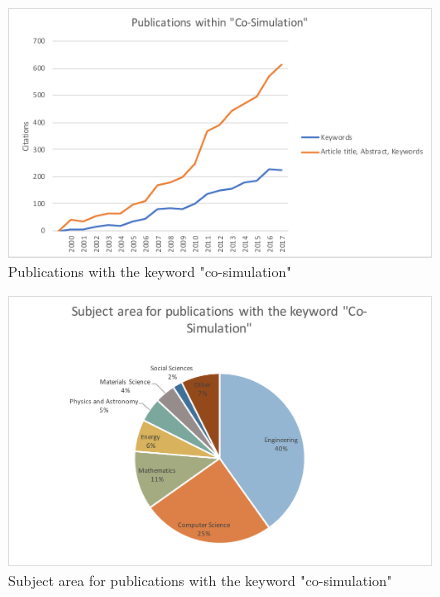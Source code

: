 \begin{figure}[h!]
\centering
\includegraphics[width=1\textwidth]{Figures/Publications.pdf}
\caption{Publications with the keyword "co-simulation"}
\label{fig:Publication}
\end{figure}

\begin{figure}[h!]
\centering
\includegraphics[width=1\textwidth]{Figures/Subject.pdf}
\caption{Subject area for publications with the keyword "co-simulation"}
\label{fig:Subject}
\end{figure}


